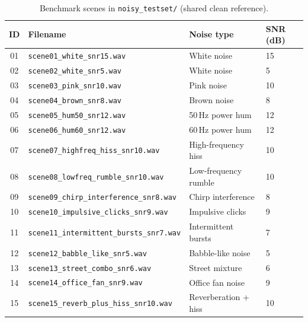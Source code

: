 \begin{table}[H]
  \centering
  \caption{Benchmark scenes in \texttt{noisy\_testset/} (shared clean reference).}
  \label{tab:scene_list}
  \small
  \begin{tabular}{clll}
    \toprule
    \textbf{ID} & \textbf{Filename} & \textbf{Noise type} & \textbf{SNR (dB)} \\
    \midrule
    01 & \texttt{scene01\_white\_snr15.wav}              & White noise         & 15 \\
    02 & \texttt{scene02\_white\_snr5.wav}               & White noise         & 5  \\
    03 & \texttt{scene03\_pink\_snr10.wav}               & Pink noise          & 10 \\
    04 & \texttt{scene04\_brown\_snr8.wav}               & Brown noise         & 8  \\
    05 & \texttt{scene05\_hum50\_snr12.wav}              & 50\,Hz power hum    & 12 \\
    06 & \texttt{scene06\_hum60\_snr12.wav}              & 60\,Hz power hum    & 12 \\
    07 & \texttt{scene07\_highfreq\_hiss\_snr10.wav}     & High-frequency hiss & 10 \\
    08 & \texttt{scene08\_lowfreq\_rumble\_snr10.wav}     & Low-frequency rumble& 10 \\
    09 & \texttt{scene09\_chirp\_interference\_snr8.wav} & Chirp interference  & 8  \\
    10 & \texttt{scene10\_impulsive\_clicks\_snr9.wav}   & Impulsive clicks    & 9  \\
    11 & \texttt{scene11\_intermittent\_bursts\_snr7.wav}& Intermittent bursts & 7  \\
    12 & \texttt{scene12\_babble\_like\_snr5.wav}        & Babble-like noise   & 5  \\
    13 & \texttt{scene13\_street\_combo\_snr6.wav}       & Street mixture      & 6  \\
    14 & \texttt{scene14\_office\_fan\_snr9.wav}          & Office fan noise    & 9  \\
    15 & \texttt{scene15\_reverb\_plus\_hiss\_snr10.wav} & Reverberation + hiss& 10 \\
    \bottomrule
  \end{tabular}
\end{table}

